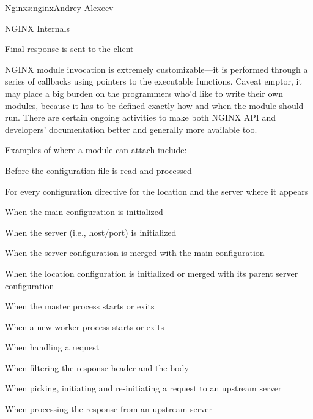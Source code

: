 \begin{aosachapter}{Nginx}{s:nginx}{Andrey Alexeev}
\begin{aosasect1}{NGINX Internals}
\begin{aosaitemize}
\item Final response is sent to the client

\end{aosaitemize}

NGINX module invocation is extremely customizable---it is performed
through a series of callbacks using pointers to the executable
functions. Caveat emptor, it may place a big burden on the programmers
who'd like to write their own modules, because it has to be defined
exactly how and when the module should run. There are certain ongoing
activities to make both NGINX API and developers' documentation better
and generally more available too.

Examples of where a module can attach include:

\begin{aosaitemize}

\item Before the configuration file is read and processed

\item For every configuration directive for the location and the
server where it appears

\item When the main configuration is initialized

\item When the server (i.e., host/port) is initialized

\item When the server configuration is merged with the main
configuration

\item When the location configuration is initialized or merged with
its parent server configuration

\item When the master process starts or exits

\item When a new worker process starts or exits

\item When handling a request

\item When filtering the response header and the body

\item When picking, initiating and re-initiating a request to an
upstream server

\item When processing the response from an upstream server


\end{aosaitemize}
\end{aosasect1}
\end{aosachapter}
